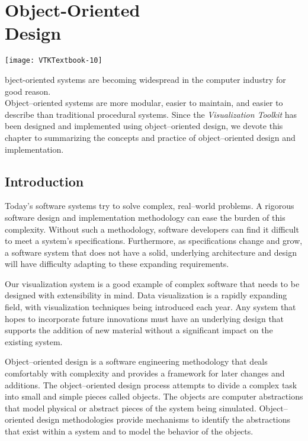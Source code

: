 \chapter[Object-Oriented Design]{Object-Oriented\\ Design}
\label{chap:object_oriented_design}

\vspace{-9\baselineskip} %
\hfill
 \begin{minipage}{0.5\textwidth}
 \centering
 \texttt{[image: VTKTextbook-10]}
 \end{minipage}
\vspace{2\baselineskip}

bject-oriented systems are becoming widespread in
the computer industry for good reason. \\Object--oriented systems are more modular, easier to maintain, and easier to describe than traditional procedural systems. Since the \emph{Visualization Toolkit} has been designed and implemented using object--oriented design, we devote this chapter to summarizing the concepts and practice of object--oriented design and implementation.

\section{Introduction}

Today's software systems try to solve complex, real--world problems. A rigorous software design and implementation methodology can ease the burden of this complexity. Without such a methodology, software developers can find it difficult to meet a system's specifications. Furthermore, as specifications change and grow, a software system that does not have a solid, underlying architecture and design will have difficulty adapting to these expanding requirements.

Our visualization system is a good example of complex software that needs to be designed with extensibility in mind. Data visualization is a rapidly expanding field, with visualization techniques being introduced each year. Any system that hopes to incorporate future innovations must have an underlying design that supports the addition of new material without a significant impact on the existing system.

Object--oriented design is a software engineering methodology that deals comfortably with complexity and provides a framework for later changes and additions. The object--oriented design process attempts to divide a complex task into small and simple pieces called objects. The objects are computer abstractions that model physical or abstract pieces of the system being simulated. Object--oriented design methodologies provide mechanisms to identify the abstractions that exist within a system and to model the behavior of the objects.

